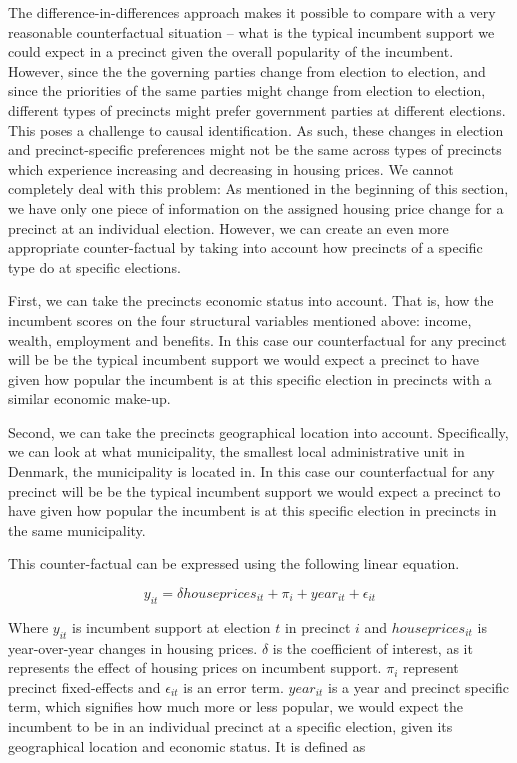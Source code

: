 \documentclass[12pt,a4paper]{article}
\begin{document}
The difference-in-differences approach makes it possible to compare with a very reasonable counterfactual situation -- what is the typical incumbent support we could expect in a precinct given the overall popularity of the incumbent. However, since the the governing parties change from election to election, and since the priorities of the same parties might change from election to election, different types of precincts might prefer government parties at  different elections. This poses a challenge to causal identification. As such,  these changes in election and precinct-specific preferences might not be the same across types of precincts which experience increasing and decreasing in housing prices. We cannot completely deal with this problem: As mentioned in the beginning of this section, we have only one piece of information on the assigned housing price change for a precinct at an individual election. However, we can create an even more appropriate counter-factual by taking into account how precincts of a specific type do at specific elections.

First, we can take the precincts economic status into account. That is, how the incumbent scores on the four structural variables mentioned above: income, wealth, employment and benefits. In this case our counterfactual for any precinct will be be the typical incumbent support we would expect a precinct to have given how popular the incumbent is at this specific election in precincts with a similar economic make-up.

Second, we can take the precincts geographical location into account. Specifically, we can look at what municipality,  the smallest local administrative unit in Denmark, the municipality is located in. In this case our counterfactual for any precinct will be be the typical incumbent support we would expect a precinct to have given how popular the incumbent is at this specific election in precincts in the same municipality.

This counter-factual can be expressed using the following linear equation.

\begin{equation}
y_{it}= \delta houseprices_{it} + \pi_i + year_{it} + \epsilon_{it}
\end{equation}

Where $y_{it}$ is incumbent support at election $t$ in precinct $i$ and $houseprices_{it}$ is year-over-year changes in housing prices. $\delta$ is the coefficient of interest, as it represents the effect of housing prices on incumbent support.  $\pi_i$ represent precinct fixed-effects and $\epsilon_{it}$ is an error term. $year_{it}$ is a year and precinct specific term, which signifies how much more or less popular, we would expect the incumbent to be in an individual precinct at a specific election, given its geographical location and economic status. It is defined as
\end{document}
